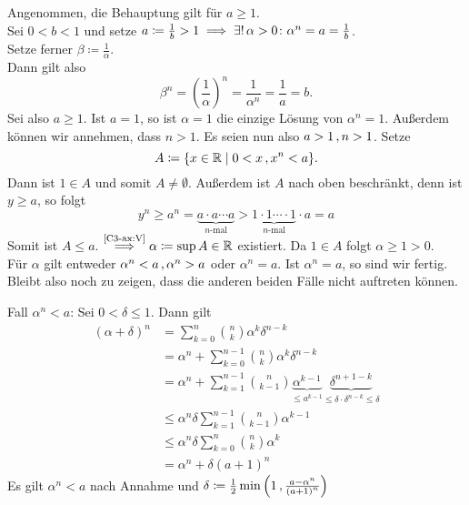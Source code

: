 \documentclass[../ana1.tex]{subfiles}
\begin{document}
\begin{bew}
	Angenommen, die Behauptung gilt für \(a \geq 1 \). \\
	Sei \(0 < b < 1\) und setze \(a \coloneqq \frac{1}{b} > 1 \implies \exists! \, \alpha > 0 \colon \alpha^n = a = \frac{1}{b} \). \\
	Setze ferner \(\beta \coloneqq \frac{1}{\alpha}\). \\
	Dann gilt also
	\[ \beta^n = {\left(\frac{1}{\alpha}\right)}^n = \frac{1}{\alpha^n} = \frac{1}{a} = b.\]
	Sei also \(a \geq 1 \). Ist \(a = 1 \), so ist \(\alpha = 1 \) die einzige Lösung von \(\alpha^n = 1 \). Außerdem können wir annehmen, dass \(n > 1 \).
	Es seien nun also \(a > 1 \operatorname{,} n > 1 \). Setze
	\[ A \coloneqq \{ x \in \mathbb{R} \; \vert \; 0 < x \operatorname{,} x^n< a \}. \]
	Dann ist \(1 \in A \) und somit \(A \neq \emptyset \). Außerdem ist \(A \) nach oben beschränkt, denn ist \(y \geq a\), so folgt
	\[ y^n \geq a^n = \underbrace{a \cdot a \cdots a}_{n\text{-mal}} > \underbrace{1 \cdot 1 \cdots \cdot 1}_{n\text{-mal}} \cdot a = a \]
	Somit ist \(A \leq a \). \(\overset{\text{\autoref{C3-ax:V}}}{\implies} \alpha \coloneqq \sup A \in \R \) existiert. Da \(1 \in A \) folgt \(\alpha \geq 1 > 0 \). \\
	Für \(\alpha \) gilt entweder \(\alpha^n <a \operatorname{,} \alpha^n > a \) oder \(\alpha^n = a \). Ist \(\alpha^n = a \), so sind wir fertig. Bleibt also noch zu zeigen,
	dass die anderen beiden Fälle nicht auftreten können.
	\begin{faelle}
		\item[Fall \(\alpha^n < a\):] Sei \(0 < \delta \leq 1 \). Dann gilt
			\!\begin{align}
				{(\alpha + \delta)}^n & = \sum_{k=0}^{n} \binom{n}{k} \alpha^k\delta^{n-k} \nonumber \\
								  	  & = \alpha^n + \sum_{k=0}^{n-1} \binom{n}{k} \alpha^k\delta^{n-k} \nonumber \\
									  & = \alpha^n + \sum_{k=1}^{n-1} \binom{n}{k-1} \underbrace{\alpha^{k-1}}_{\leq a^{k-1}}\underbrace{\delta^{n+1-k}}_{\leq \delta \cdot \delta^{n-k} \leq \delta} \nonumber \\
									  & \leq \alpha^n \delta \sum_{k=1}^{n-1} \binom{n}{k-1} \alpha^{k-1} \nonumber \\
									  & \leq \alpha^n \delta \sum_{k=0}^{n} \binom{n}{k} \alpha^{k} \nonumber \\
									  & = \alpha^n + \delta {(a+1)}^n \tag{*}
			\end{align}
			Es gilt \(\alpha^n < a\) nach Annahme und \(\delta \coloneqq \frac{1}{2} \min{\left(1 \operatorname{,}\frac{a-\alpha^n}{{(a+1)}^n}\right)} \) \\

\end{faelle}
\end{bew}
\end{document}
